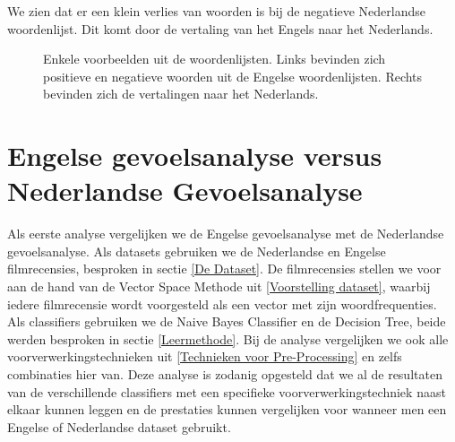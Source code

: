 We zien dat er een klein verlies van woorden is bij de negatieve Nederlandse woordenlijst. Dit komt door de vertaling van het Engels naar het Nederlands.

\begin{figure}%
    \centering
    \caption{Enkele voorbeelden uit de woordenlijsten. Links bevinden zich positieve en negatieve woorden uit de Engelse woordenlijsten. Rechts bevinden zich de vertalingen naar het Nederlands.}
    \label{vbwoordenlijsten}
\end{figure}

\section{Engelse gevoelsanalyse versus Nederlandse Gevoelsanalyse}\label{Engelse gevoelsanalyse versus Nederlandse Gevoelsanalyse}

Als eerste analyse vergelijken we de Engelse gevoelsanalyse met de Nederlandse gevoelsanalyse. Als datasets gebruiken we de Nederlandse en Engelse filmrecensies, besproken in sectie \ref{De Dataset}. De filmrecensies stellen we voor aan de hand van de Vector Space Methode uit \ref{Voorstelling dataset}, waarbij iedere filmrecensie wordt voorgesteld als een vector met zijn woordfrequenties. Als classifiers gebruiken we de Naive Bayes Classifier en de Decision Tree, beide werden besproken in sectie \ref{Leermethode}. Bij de analyse vergelijken we ook alle voorverwerkingstechnieken uit \ref{Technieken voor Pre-Processing} en zelfs combinaties hier van. Deze analyse is zodanig opgesteld dat we al de resultaten van de verschillende classifiers met een specifieke voorverwerkingstechniek naast elkaar kunnen leggen en de prestaties kunnen vergelijken voor wanneer men een Engelse of Nederlandse dataset gebruikt.\\

